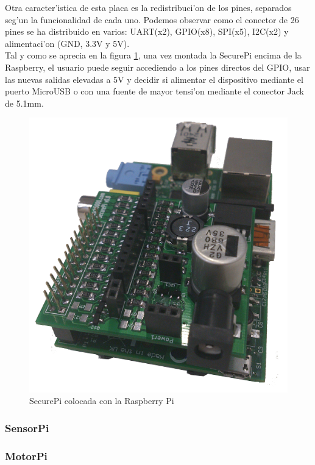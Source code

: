 \documentclass[twoside,12pt]{article}
\begin{document}
Otra caracter'istica de esta placa es la redistribuci'on de los pines, separados seg'un la funcionalidad de cada uno. Podemos observar como el conector de 26 pines se ha distribuido en varios: UART(x2), GPIO(x8), SPI(x5), I2C(x2) y alimentaci'on (GND, 3.3V y 5V).\\

Tal y como se aprecia en la figura \ref{fig:SecurePi_mounted}, una vez montada la SecurePi encima de la Raspberry, el usuario puede seguir accediendo a los pines directos del GPIO, usar las nuevas salidas elevadas a 5V y decidir si alimentar el dispositivo mediante el puerto MicroUSB o con una fuente de mayor tensi'on mediante el conector Jack de 5.1mm.

\begin{figure}[ht]
\centering
\includegraphics[scale=0.40]{images/SecurePi_mounted.png}
\caption{SecurePi colocada con la Raspberry Pi}
\label{fig:SecurePi_mounted}
\end{figure} 

\subsubsection{SensorPi}

\subsubsection{MotorPi}
\end{document}
